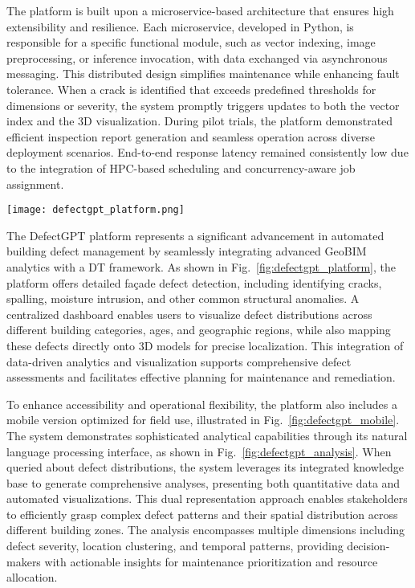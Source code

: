 \documentclass[a4paper,fleqn]{cas-sc}
\begin{document}
The platform is built upon a microservice-based architecture that ensures high extensibility and resilience. Each microservice, developed in Python, is responsible for a specific functional module, such as vector indexing, image preprocessing, or inference invocation, with data exchanged via asynchronous messaging. This distributed design simplifies maintenance while enhancing fault tolerance. When a crack is identified that exceeds predefined thresholds for dimensions or severity, the system promptly triggers updates to both the vector index and the 3D visualization. During pilot trials, the platform demonstrated efficient inspection report generation and seamless operation across diverse deployment scenarios. End-to-end response latency remained consistently low due to the integration of HPC-based scheduling and concurrency-aware job assignment.
\begin{figure*}
    \centering
    \texttt{[image: defectgpt\_platform.png]}
    \caption{DefectGPT Platform: Integrated GeoBIM analytics with a DT visualization system. The interface provides insights into façade defect detection, distributions, and comparative analysis, enhancing defect management workflows.}
    \label{fig:defectgpt_platform}
\end{figure*}




The DefectGPT platform represents a significant advancement in automated building defect management by seamlessly integrating advanced GeoBIM analytics with a DT framework. As shown in Fig.~\ref{fig:defectgpt_platform}, the platform offers detailed façade defect detection, including identifying cracks, spalling, moisture intrusion, and other common structural anomalies. A centralized dashboard enables users to visualize defect distributions across different building categories, ages, and geographic regions, while also mapping these defects directly onto 3D models for precise localization. This integration of data-driven analytics and visualization supports comprehensive defect assessments and facilitates effective planning for maintenance and remediation.

To enhance accessibility and operational flexibility, the platform also includes a mobile version optimized for field use, illustrated in Fig.~\ref{fig:defectgpt_mobile}. The system demonstrates sophisticated analytical capabilities through its natural language processing interface, as shown in Fig.~\ref{fig:defectgpt_analysis}. When queried about defect distributions, the system leverages its integrated knowledge base to generate comprehensive analyses, presenting both quantitative data and automated visualizations. This dual representation approach enables stakeholders to efficiently grasp complex defect patterns and their spatial distribution across different building zones. The analysis encompasses multiple dimensions including defect severity, location clustering, and temporal patterns, providing decision-makers with actionable insights for maintenance prioritization and resource allocation.
\end{document}
